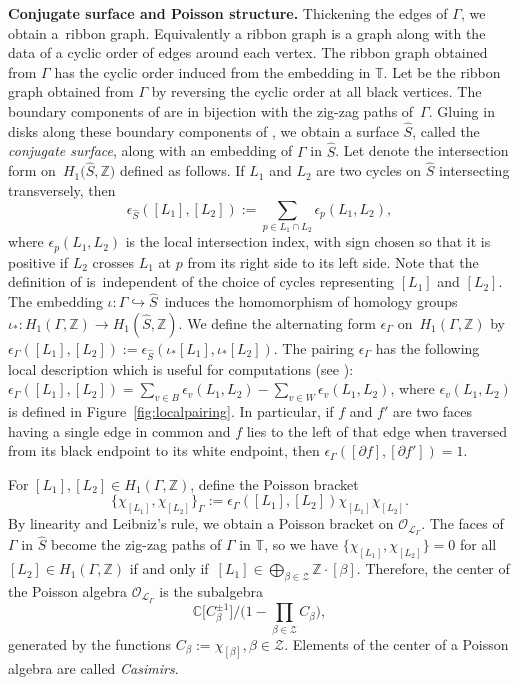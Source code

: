 \documentclass[pdftex]{sigma}
\numberwithin{equation}{section}
\newcommand{\Z}{{\mathbb Z}}
\newcommand{\C}{{\mathbb C}}
\newcommand{\T}{{\mathbb T}}
\newcommand{\ra}{\rightarrow}
\begin{document}
{\bf Conjugate surface and Poisson structure.}
	Thickening the edges of $\Gamma$, we obtain a~ribbon graph. Equivalently a ribbon graph is a graph along with the data of a cyclic order of edges around each vertex. The ribbon graph obtained from $\Gamma$ has the cyclic order induced from the embedding in $\T$. Let \smash{$\widehat \Gamma$} be the ribbon graph obtained from $\Gamma$ by reversing the cyclic order at all black vertices. The boundary components of \smash{$\widehat \Gamma$} are in bijection with the zig-zag paths of~$\Gamma$. Gluing in disks along these boundary components of \smash{$\widehat \Gamma$}, we obtain a surface $\widehat S$, called the \emph{conjugate surface}, along with an embedding of $\Gamma$ in $\widehat S$. Let  denote the intersection form on~$H_1\big(\widehat S,\Z\big)$ defined as follows. If $L_1$ and $L_2$ are two cycles on $\widehat S$ intersecting transversely, then
	\[
		\epsilon_{\widehat S }([L_1],[L_2]):=\sum_{p \in L_1 \cap L_2} \epsilon_p(L_1,L_2),
	\]
	where $\epsilon_p(L_1,L_2)$ is the local intersection index, with sign chosen so that it is positive if $L_2$ crosses $L_1$ at $p$ from its right side to its left side. {Note that the definition of  is~independent of the choice of cycles representing $[L_1]$ and $[L_2]$.} The embedding $\iota\colon \Gamma \hookrightarrow \widehat S$~induces the homomorphism of homology groups $\iota_*\colon H_1(\Gamma,\Z) \ra H_1(\widehat S,\Z)$. We define the alternating form $\epsilon_\Gamma$ on~$H_1(\Gamma,\Z)$ by $\epsilon_\Gamma([L_1],[L_2]):=\epsilon_{\widehat S}(\iota_*[L_1],\iota_*[L_2])$. The pairing $\epsilon_\Gamma$ has the following local description which is useful for computations (see \cite[Appendix]{GK13}): $\epsilon_\Gamma([L_1],[L_2])=\sum_{v \in B} \epsilon_v(L_1,L_2)-\sum_{v \in W} \epsilon_v(L_1,L_2)$, where $\epsilon_v(L_1,L_2)$ is defined in Figure~\ref{fig:localpairing}. In particular, if $f$ and $f'$ are two faces having a single edge in common and $f$ lies to the left of that edge when traversed from its black endpoint to its white endpoint, then $\epsilon_\Gamma([\partial f],[\partial f'])=1$.
	
	
	For ${[L_1]},{[L_2]} \in H_1(\Gamma,\Z)$, define the Poisson bracket
	\[
		\{\chi_{[L_1]},\chi_{[L_2]}\}_\Gamma:=\epsilon_\Gamma([L_1],[L_2])\chi_{[L_1]}\chi_{[L_2]}.
	\]
	By linearity and Leibniz's rule, we obtain a Poisson bracket on $\mathcal O_{\mathcal L_\Gamma}$. The faces of $\Gamma$ in $\widehat S$ become the zig-zag paths of $\Gamma$ in $\T$, so we have $\{\chi_{[L_1]},\chi_{[L_2]}\}=0$ for all $[L_2] \in H_1(\Gamma,\Z)$ if and only if~$[L_1] \in \bigoplus_{\beta \in \mathcal Z} \Z \cdot [\beta]$. Therefore, the center of the Poisson algebra $\mathcal O_{\mathcal L_\Gamma}$ is the subalgebra
	\[
	\C\bigl[C_\beta^{\pm 1}\bigr]/\biggl(1-\prod_{\beta \in \mathcal Z} C_\beta\biggr),
	\]
	generated by the functions $C_\beta:=\chi_{[\beta]}, \beta \in \mathcal Z$. Elements of the center of a Poisson algebra are called \emph{Casimirs}.
	
\end{document}
